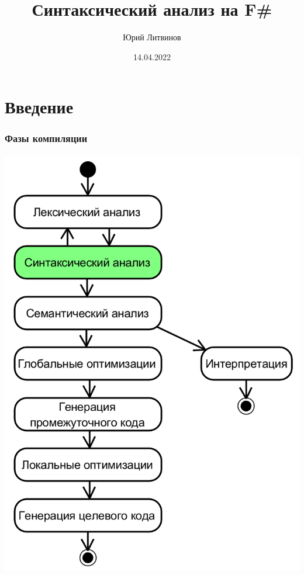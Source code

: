 \documentclass[xetex,mathserif,serif]{beamer}
\title{Синтаксический анализ на F\#}
\author{Юрий Литвинов}
\date{14.04.2022}
\begin{document}
    
    \frame{\titlepage}

    \section{Введение}

    \begin{frame}
        \frametitle{Фазы компиляции}
        \begin{center}
            \includegraphics[height=0.8\textheight]{compilerPhases.png}
        \end{center}
    \end{frame}
\end{document}
